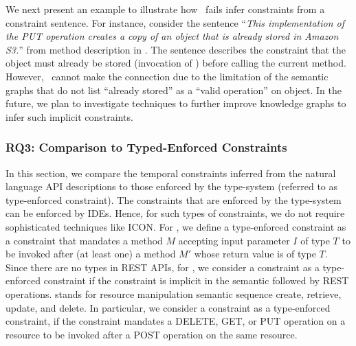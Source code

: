 We next present an example to illustrate how \tool\ fails infer constraints from a constraint sentence.
For instance, consider the sentence ``\textit{This implementation of the PUT operation creates a copy of an object that is already stored in Amazon S3.}''
from   method description in \amazonAPI.
The sentence describes the constraint that the object must already be stored (invocation of )
before calling the current method.
However, \tool\ cannot make the connection due to the limitation of the semantic graphs that do not list ``already stored'' as a ``valid operation'' on object.  
In the future, we plan to investigate techniques to further improve knowledge graphs to infer such implicit constraints.


\subsubsection{RQ3: Comparison to Typed-Enforced Constraints}

In this section, we compare the temporal constraints inferred from the natural language API descriptions to those enforced by the type-system (referred to as type-enforced constraint).
The constraints that are enforced by the type-system can be enforced by IDEs.
Hence, for such types of constraints, we do not require sophisticated techniques like ICON. 
For , we define a type-enforced constraint as a constraint that mandates a method $M$ accepting input parameter $I$ of type $T$ to be invoked after (at least one) a method $M'$ whose return value is of type $T$. 
Since there are no types in REST APIs, for , we consider a constraint as a type-enforced constraint
if the constraint is implicit in the  semantic followed by REST operations. 
 stands for resource manipulation semantic sequence create, retrieve, update, and delete.
In particular, we consider a constraint as a type-enforced constraint, if the constraint mandates a DELETE, GET, or PUT operation on a resource to be invoked after a POST operation on the same resource. 

